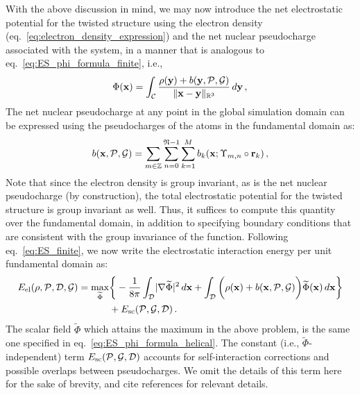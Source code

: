 \documentclass[preprint,12pt, 3p, sort&compress]{elsarticle}
\begin{document}
With the above discussion in mind, we may now introduce the net electrostatic potential for the twisted structure using the electron density (eq.~\ref{eq:electron_density_expression}) and the net nuclear pseudocharge associated with the system, in a manner that is analogous to eq.~\ref{eq:ES_phi_formula_finite}, i.e.,
\begin{align}
\Phi({\bf x}) = \int_{{\cal C}} \frac{\rho({\bf y}) +b({\bf y},{\cal P},{\cal G})}{\lVert{\bf x} - {\bf y}\rVert_{\mathbb{R}^3}}\,d{\bf y}\,,
\label{eq:ES_phi_formula_helical} 
\end{align}
The net nuclear pseudocharge at any point in the global simulation domain can be expressed using the pseudocharges of the atoms in the fundamental domain as:
\begin{align}
b({\bf x}, {\cal P},{\cal G}) = \sum_{m \in \mathbb{Z}}\sum_{n = 0}^{\mathfrak{N}-1} \sum_{k = 1}^{M}b_{k}({\bf x}; \Upsilon_{m,n} \circ {\bf r}_k)\,,
\label{eq:Net_pseudocharge}
\end{align}
Note that since the electron density is group invariant, as is the net nuclear pseudocharge (by construction), the total electrostatic potential  for the twisted structure is group invariant as well. Thus, it suffices to compute this quantity over the fundamental domain, in addition to specifying boundary conditions that are consistent with the group invariance of the function. Following eq.~\ref{eq:ES_finite}, we now write the electrostatic interaction energy per unit fundamental domain as:
\begin{align}
\nonumber
E_{\text{el}}(\rho, {\cal P}, {\cal D}, {\cal G}) =  \max_{\widetilde{\Phi}}&\bigg\{-\frac{1}{8\pi}\int_{{\cal D}}\lvert\nabla \widetilde{\Phi}\rvert^2\,d{\bf x} + \int_{{\cal D}}\bigg(\rho({\bf x}) + b({\bf x},{\cal P},{\cal G})\bigg)\widetilde{\Phi}({\bf x})\,d{\bf x}\bigg\}\\ 
&+ E_{\text{sc}}({\cal P},{\cal G}, {\cal D})\,.
\label{eq:ES_helical} 
\end{align}
The scalar field $\widetilde{\Phi}$ which attains the maximum in the above problem, is the same one specified in eq.~\ref{eq:ES_phi_formula_helical}. The constant (i.e., $\widetilde{\Phi}$-independent)  term $E_{\text{sc}}({\cal P},{\cal G}, {\cal D})$ accounts for self-interaction corrections and possible overlaps between pseudocharges. We omit the details of this term here for the sake of brevity, and cite  references \citep{banerjee2016cyclic, ghosh2017sparc_1, suryanarayana2014augmented} for relevant details.
\end{document}
